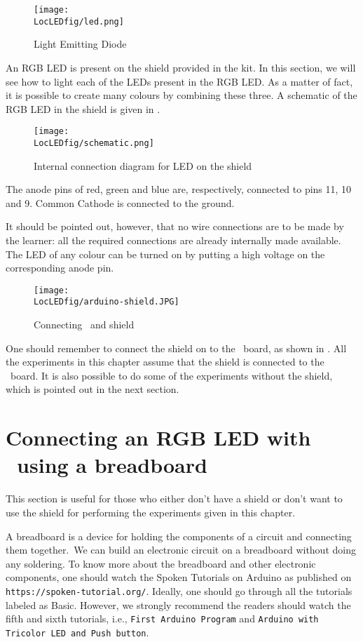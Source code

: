 \begin{figure}
  \centering
  \texttt{[image: \\LocLEDfig/led.png]}
  \caption{Light Emitting Diode}
  \label{fig:ledsym}
\end{figure}

An RGB LED is present on the shield provided in the kit.  In this
section, we will see how to light each of the LEDs present in the RGB
LED.  As a matter of fact, it is possible to create many colours by
combining these three.  A schematic of the RGB LED in the shield is
given in .
\begin{figure}
  \centering
  \texttt{[image: \\LocLEDfig/schematic.png]}
  \caption{Internal connection diagram for LED on the shield}
  \label{fig:ledblock}
\end{figure}
The anode pins of red, green and blue are, respectively, connected to
pins 11, 10 and 9.  Common Cathode is connected to the ground.

It should be pointed out, however, that no wire connections are to be
made by the learner: all the required connections are already
internally made available.  The LED of any colour can be turned on by
putting a high voltage on the corresponding anode pin.

\begin{figure}
  \centering
  \texttt{[image: \\LocLEDfig/arduino-shield.JPG]}
  \caption{Connecting \arduino\ and shield}
  \label{fig:uno-shield-connect}
\end{figure}

One should remember to connect the shield on to the \arduino\ board, as
shown in . All the experiments in this
chapter assume that the shield is connected to the \arduino\ board.
It is also possible to do some of the experiments without the shield,
which is pointed out in the next section. 

\section{Connecting an RGB LED with \arduino\ using a breadboard}
This section is useful for those who either don't have a shield or don't want to use the shield
for performing the experiments given in this chapter. 

A breadboard is a device for holding the components of a circuit and connecting 
them together. We can build an electronic circuit on a breadboard without doing any 
soldering. To know more about the breadboard and other electronic components, 
one should watch the Spoken Tutorials on Arduino as published on
{\tt https://spoken-tutorial.org/}. Ideally, one should go through all the
tutorials labeled as Basic. However, we strongly recommend the readers should
watch the fifth and sixth tutorials, i.e., {\tt First Arduino Program} and 
{\tt Arduino with Tricolor LED and Push button}.

